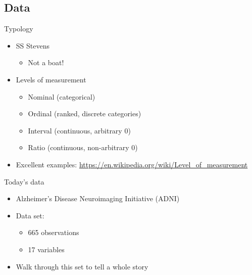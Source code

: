 \documentclass[
  ignorenonframetext,
]{beamer}
\providecommand{\tightlist}{%
  \setlength{\itemsep}{0pt}\setlength{\parskip}{0pt}}
\begin{document}
\hypertarget{data}{%
\subsection{Data}\label{data}}

\begin{frame}{Typology}
\protect\hypertarget{typology}{}

\begin{itemize}[<+->]
\tightlist
\item
  SS Stevens

  \begin{itemize}[<+->]
  \tightlist
  \item
    Not a boat!
  \end{itemize}
\item
  Levels of measurement

  \begin{itemize}[<+->]
  \tightlist
  \item
    Nominal (categorical)
  \item
    Ordinal (ranked, discrete categories)
  \item
    Interval (continuous, arbitrary 0)
  \item
    Ratio (continuous, non-arbitrary 0)
  \end{itemize}
\item
  Excellent examples:
  \url{https://en.wikipedia.org/wiki/Level_of_measurement}
\end{itemize}

\end{frame}

\begin{frame}{Today's data}
\protect\hypertarget{todays-data}{}

\begin{itemize}[<+->]
\tightlist
\item
  Alzheimer's Disease Neuroimaging Initiative (ADNI)
\item
  Data set:

  \begin{itemize}[<+->]
  \tightlist
  \item
    665 observations
  \item
    17 variables
  \end{itemize}
\item
  Walk through this set to tell a whole story
\end{itemize}

\end{frame}
\end{document}
